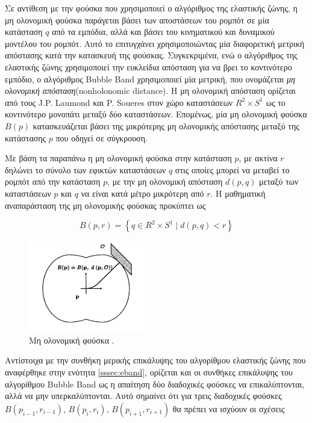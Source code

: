 \bigskip
Σε αντίθεση με την φούσκα που χρησιμοποιεί ο αλγόριθμος της ελαστικής ζώνης, η μη ολονομική φούσκα παράγεται βάσει των αποστάσεων του ρομπότ σε μία κατάσταση $q$ από τα εμπόδια, αλλά και βάσει του κινηματικού και δυναμικού μοντέλου του ρομπότ. Αυτό το επιτυγχάνει χρησιμοποιώντας μία διαφορετική μετρική απόστασης κατά την κατασκευή της φούσκας. Συγκεκριμένα, ενώ ο αλγόριθμος της ελαστικής ζώνης χρησιμοποιεί την ευκλείδια απόσταση για να βρει το κοντινότερο εμπόδιο, ο αλγόριθμος Bubble Band χρησιμοποιεί μία μετρική, που ονομάζεται \textit{μη ολονομική απόσταση}(nonholonomic distance). Η μη ολονομική απόσταση ορίζεται από τους J.P. Laumond και P. Soueres \cite{rs_metric} στον χώρο καταστάσεων $R^2 \times S^1$ ως το κοντινότερο μονοπάτι μεταξύ δύο καταστάσεων. Επομένως, μία μη ολονομική φούσκα $B(p)$ κατασκευάζεται βάσει της μικρότερης μη ολονομικής απόστασης μεταξύ της κατάστασης $p$ που οδηγεί σε σύγκρουση.

\bigskip
Με βάση τα παραπάνω η μη ολονομική φούσκα στην κατάσταση $p$, με ακτίνα $r$ δηλώνει το σύνολο των εφικτών καταστάσεων $q$ στις οποίες μπορεί να μεταβεί το ρομπότ από την κατάσταση $p$, με την μη ολονομική απόσταση $d(p,q)$ μεταξύ των καταστάσεων $p$ και $q$ να είναι κατά μέτρο μικρότερη από $r$. Η μαθηματική αναπαράσταση της μη ολονομικής φούσκας προκύπτει ως

\begin{equation}
	B(p,r) = \left\{q \in R^2 \times S^1 \; | \; d(p,q)<r \right\}
\end{equation}

\begin{figure}[!ht]
	\centering
	\includegraphics[height=4cm]{Chapters/Chapter3/Figures/nh_bubble.png}
	\caption[Μη ολονομική φούσκα.]{Μη ολονομική φούσκα \cite{dpm}.}
	\label{fig:nh_bubble}
\end{figure}

Αντίστοιχα με την συνθήκη μερικής επικάλυψης του αλγορίθμου ελαστικής ζώνης που αναφέρθηκε στην ενότητα \ref{sssec:eband}, ορίζεται και οι συνθήκες επικάλυψης του αλγορίθμου Bubble Band ως η απαίτηση δύο διαδοχικές φούσκες να επικαλύπτονται, αλλά να μην υπερκαλύπτονται. Αυτό σημαίνει ότι για τρεις διαδοχικές φούσκες $B(p_{i-1},r_{i-1})$, $B(p_i,r_i)$, $B(p_{i+1},r_{i+1})$ θα πρέπει να ισχύουν οι σχέσεις

